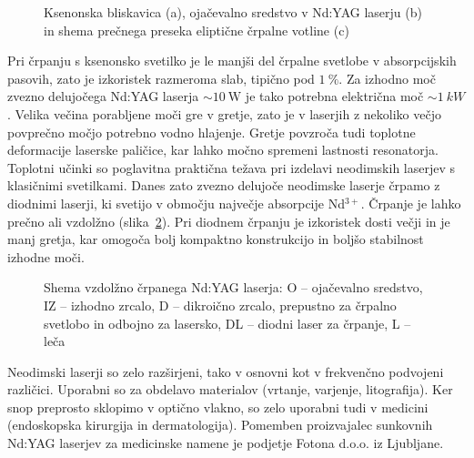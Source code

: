 \begin{figure}[ht]
\centering
\def\svgwidth{120truemm} 

\caption{Ksenonska bliskavica (a), ojačevalno sredstvo v Nd:YAG laserju (b) 
in shema prečnega preseka eliptične črpalne votline (c)}
\label{fig:Nd}
\end{figure}

Pri črpanju s ksenonsko svetilko je le manjši del črpalne svetlobe v
absorpcijskih pasovih, zato je izkoristek razmeroma slab, tipično 
pod $1~\%$. Za izhodno moč zvezno delujočega Nd:YAG laserja $\sim 10~\si{\watt}$ je tako
potrebna električna moč $\sim 1~\si{kW}$. Velika večina porabljene moči 
gre v gretje, zato je v laserjih z nekoliko večjo povprečno
močjo potrebno vodno hlajenje. Gretje povzroča tudi toplotne deformacije
laserske paličice, kar lahko močno spremeni lastnosti resonatorja. Toplotni
učinki so poglavitna praktična težava pri izdelavi neodimskih
laserjev s klasičnimi svetilkami. Danes zato zvezno delujoče neodimske laserje
črpamo z diodnimi laserji, ki svetijo v območju največje
absorpcije Nd$^{3+}$. Črpanje je lahko prečno ali vzdolžno (slika~\ref{fig:NdS}). 
Pri diodnem črpanju je izkoristek dosti večji in je manj gretja, kar omogoča 
bolj kompaktno konstrukcijo in boljšo stabilnost izhodne moči.
\begin{figure}[ht]
\centering
\def\svgwidth{120truemm} 
\caption{Shema vzdolžno črpanega Nd:YAG laserja: O -- ojačevalno sredstvo, 
IZ -- izhodno zrcalo, D -- dikroično zrcalo, 
prepustno za črpalno svetlobo in odbojno za lasersko, DL -- diodni 
laser za črpanje, L -- leča
}
\label{fig:NdS}
\end{figure}

Neodimski laserji so zelo razširjeni, tako v osnovni kot v frekvenčno 
podvojeni različici. Uporabni so za obdelavo materialov (vrtanje, varjenje, 
litografija). Ker snop preprosto sklopimo v optično vlakno, so 
zelo uporabni tudi v medicini (endoskopska kirurgija in dermatologija). 
Pomemben proizvajalec sunkovnih Nd:YAG laserjev 
za medicinske namene je podjetje Fotona d.o.o. iz Ljubljane.


